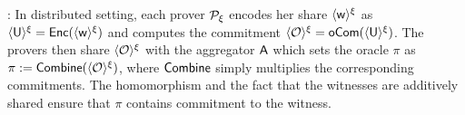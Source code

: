 : In distributed setting, each prover
$\mathcal{P}_\xi$ encodes her share $\langle{\mathsf{w}}\rangle^\xi$ as $\langle{\mathsf{U}}\rangle^\xi=\mathsf{Enc}(\langle{\mathsf{w}}\rangle^\xi)$
and computes the commitment $\langle{\mathcal{O}}\rangle^\xi=\mathsf{oCom}(\langle{\mathsf{U}}\rangle^\xi)$. The provers
then share $\langle{\mathcal{O}}\rangle^\xi$ with the aggregator $\mathsf{A}$ which sets the oracle
$\pi$ as $\pi := \mathsf{Combine}(\langle{\mathcal{O}}\rangle^\xi)$, where $\mathsf{Combine}$ simply multiplies the corresponding commitments. The homomorphism and the fact that the witnesses are additively shared ensure that $\pi$ contains commitment to the witness. 

\begin{comment}
\noindent{\bf Distributed Proximity Test}: The provers jointly prove that 
the oracle is well formed as follows: On receiving the verifier’s challenge 
$r\in\FF^p$ on broadcast channel, the prover $\distprover$ locally computes
$\shr{\tilde{U}}=\sum_{i\in [p]}r_i\shr{\ewit}[i,\cdot,\cdot]$, commitments
$\shr{\tilde{c}_k}=\sum_{i\in [p]}\shr{\comoracle}[i,k]$ for $k\in [\ell]$. They
send the shares of the commitments to the aggregator, who computes
$(\tilde{c}_1,\ldots,\tilde{c}_\ell)=\combine(\shr{\tilde{c}_1},\ldots,\shr{\tilde{c}_\ell})$
and forwards these to the verifier. Next, the provers jointly prove that
$\tilde{c}_1,\ldots,\tilde{c}_\ell$ corresponds to a matrix $\overline{U}$ such
that $\overline{U}\mc{T}\in \mc{C}_2$. This is done via distributed variant of
membership protocol that we describe next.  

\noindent{\bf Distributed Membership Test}: 
This protocol reduces to each prover responding to verifier’s
challenge on their share, as in the single    prover setting. The prover
responses are aggregated to compute the response to    the verifier. The
complete protocol appears in Figure \ref{fig:distprox2d}. In Figure
\ref{fig:distprox2d}, we note that the aggregator obtains the witness to the
inner product protocol in step 7, and hence does not need to interact further
with the provers. 
\end{comment}

